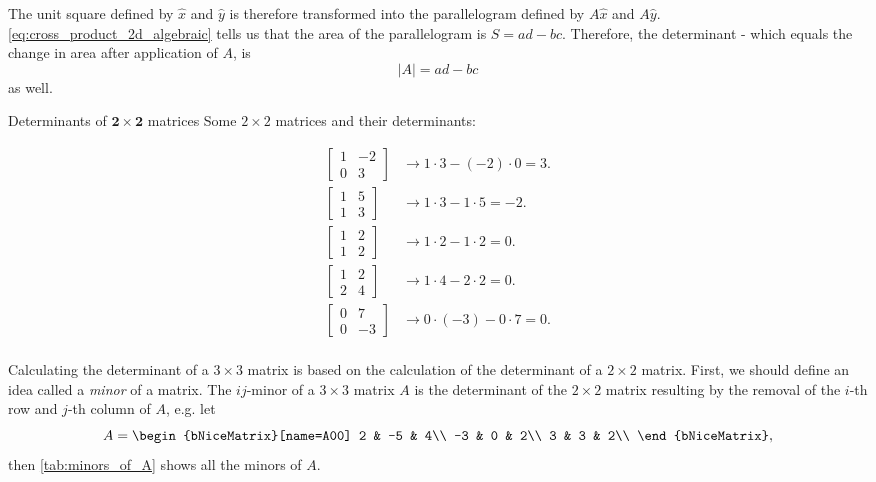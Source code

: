 The unit square defined by $\hat{x}$ and $\hat{y}$ is therefore transformed into the parallelogram defined by $A\hat{x}$ and $A\hat{y}$. \autoref{eq:cross_product_2d_algebraic} tells us that the area of the parallelogram is $S=ad-bc$. Therefore, the determinant - which equals the change in area after application of $A$, is
\begin{equation}
	|A| = ad-bc
	\label{eq:determinant_2x2}
\end{equation}
as well.

\begin{example}{Determinants of $\bm{2\times2}$ matrices}{}
	Some $2\times2$ matrices and their determinants:

	\begin{align*}
		\begin{bmatrix} 1&-2\\0&3 \end{bmatrix} &\longrightarrow 1\cdot3-(-2)\cdot0 = 3.\\
		\begin{bmatrix} 1&5\\1&3 \end{bmatrix} &\longrightarrow 1\cdot3-1\cdot5 = -2.\\
		\begin{bmatrix} 1&2\\1&2 \end{bmatrix} &\longrightarrow 1\cdot2-1\cdot2 = 0.\\
		\begin{bmatrix} 1&2\\2&4 \end{bmatrix} &\longrightarrow 1\cdot4-2\cdot2 = 0.\\
		\begin{bmatrix} 0&7\\0&-3 \end{bmatrix} &\longrightarrow 0\cdot(-3)-0\cdot7 = 0.\\
	\end{align*}
\end{example}

Calculating the determinant of a $3\times3$ matrix is based on the calculation of the determinant of a $2\times2$ matrix. First, we should define an idea called a \emph{minor} of a matrix. The $ij$-minor of a $3\times3$ matrix $A$ is the determinant of the $2\times2$ matrix resulting by the removal of the $i$-th row and $j$-th column of $A$, e.g. let
\newcommand{\Aminor}[1]{
	\begin{bNiceMatrix}[name=#1]
		2 & -5 & 4\\
		-3 & 0 & 2\\
		3 & 3 & 2\\
	\end{bNiceMatrix}
}
\[
	A = \Aminor{A00},
\]
then \autoref{tab:minors_of_A} shows all the minors of $A$.

